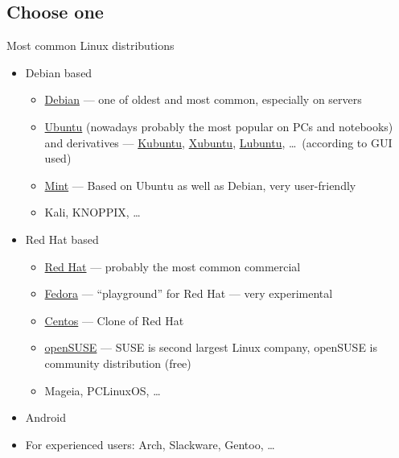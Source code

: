 \documentclass[compress, ucs, xelatex, 11pt, xcolor=svgnames,
  hyperref={
    bookmarks=true,
    unicode=true,
    colorlinks=true,
    pdftitle={Linux, command line and MetaCentrum},
    plainpages=false,
    pdfauthor={Vojtech Zeisek},
    pdfsubject={Course about use of Linux command line, writing shell scripts and using MetaCentrum of CESNET},
    pdfcreator={XeLaTeX, http://www.xelatex.org/},
    pdfkeywords={Linux, GNU, BASH, shell, command line, MetaCentrum},
    linkcolor=Sienna,
    anchorcolor=black,
    citecolor=green,
    filecolor=magenta,
    menucolor=Sienna,
    urlcolor=cyan,
    pdftex},
  url={hyphens, lowtilde} %
  ]{beamer}
\begin{document}
\subsection{Choose one}

\begin{frame}{Most common Linux distributions}
\begin{itemize}
  \item Debian based
  \begin{itemize}
    \item \href{https://www.debian.org/}{Debian} --- one of oldest and most common, especially on servers
    \item \href{http://www.ubuntu.com/}{Ubuntu} (nowadays probably the most popular on PCs and notebooks) and derivatives --- \href{https://www.kubuntu.org/}{Kubuntu}, \href{https://xubuntu.org/}{Xubuntu}, \href{http://lubuntu.net/}{Lubuntu}, \ldots~(according to GUI used)
    \item \href{http://linuxmint.com/}{Mint} --- Based on Ubuntu as well as Debian, very user-friendly
    \item Kali, KNOPPIX, \ldots
  \end{itemize}
  \item Red Hat based
  \begin{itemize}
    \item \href{https://www.redhat.com/}{Red Hat} --- probably the most common commercial
    \item \href{https://getfedora.org/}{Fedora} --- ``playground'' for Red Hat --- very experimental
    \item \href{https://www.centos.org/}{Centos} --- Clone of Red Hat
    \item \href{https://www.opensuse.org/}{openSUSE} --- SUSE is second largest Linux company, openSUSE is community distribution (free)
    \item Mageia, PCLinuxOS, \ldots
  \end{itemize}
  \item Android
  \item For experienced users: Arch, Slackware, Gentoo, \ldots
\end{itemize}
\end{frame}
\end{document}
